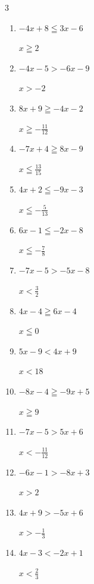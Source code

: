 \begin{multicols}{3}
\begin{enumerate}
  \item $-4x+8\leqq 3x-6$

        $\displaystyle x\geqq 2$

  \item $-4x-5>-6x-9$

        $\displaystyle x>-2$

  \item $8x+9\geqq -4x-2$

        $\displaystyle x\geqq -\frac{11}{12}$

  \item $-7x+4\geqq 8x-9$

        $\displaystyle x\leqq \frac{13}{15}$

  \item $4x+2\leqq -9x-3$

        $\displaystyle x\leqq -\frac{5}{13}$

  \item $6x-1\leqq -2x-8$

        $\displaystyle x\leqq -\frac{7}{8}$

  \item $-7x-5>-5x-8$

        $\displaystyle x<\frac{3}{2}$

\columnbreak %

  \item $4x-4\geqq 6x-4$

        $\displaystyle x\leqq 0$

  \item $5x-9<4x+9$

        $\displaystyle x<18$

  \item $-8x-4\geqq -9x+5$

        $\displaystyle x\geqq 9$

  \item $-7x-5>5x+6$

        $\displaystyle x<-\frac{11}{12}$

  \item $-6x-1>-8x+3$

        $\displaystyle x>2$

  \item $4x+9>-5x+6$

        $\displaystyle x>-\frac{1}{3}$

  \item $4x-3<-2x+1$

        $\displaystyle x<\frac{2}{3}$


\end{enumerate}
\end{multicols}
